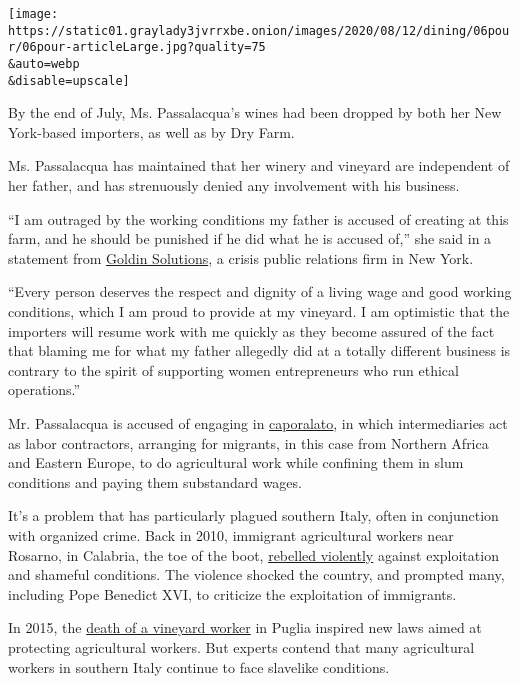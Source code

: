 \texttt{[image: https://static01.graylady3jvrrxbe.onion/images/2020/08/12/dining/06pour/06pour-articleLarge.jpg?quality=75\\\&auto=webp\\\&disable=upscale]}

By the end of July, Ms. Passalacqua's wines had been dropped by both her
New York-based importers, as well as by Dry Farm.

Ms. Passalacqua has maintained that her winery and vineyard are
independent of her father, and has strenuously denied any involvement
with his business.

``I am outraged by the working conditions my father is accused of
creating at this farm, and he should be punished if he did what he is
accused of,'' she said in a statement from
\href{https://www.goldin.com/}{Goldin Solutions}, a crisis public
relations firm in New York.

``Every person deserves the respect and dignity of a living wage and
good working conditions, which I am proud to provide at my vineyard. I
am optimistic that the importers will resume work with me quickly as
they become assured of the fact that blaming me for what my father
allegedly did at a totally different business is contrary to the spirit
of supporting women entrepreneurs who run ethical operations.''

Mr. Passalacqua is accused of engaging in
\href{https://ec.europa.eu/migrant-integration/news/italian-parliamentary-investigation-on-exploitation-of-migrant-workers-in-agriculture}{caporalato},
in which intermediaries act as labor contractors, arranging for
migrants, in this case from Northern Africa and Eastern Europe, to do
agricultural work while confining them in slum conditions and paying
them substandard wages.

It's a problem that has particularly plagued southern Italy, often in
conjunction with organized crime. Back in 2010, immigrant agricultural
workers near Rosarno, in Calabria, the toe of the boot,
\href{https://www.nytimes3xbfgragh.onion/2010/01/11/world/europe/11italy.html}{rebelled
violently} against exploitation and shameful conditions. The violence
shocked the country, and prompted many, including Pope Benedict XVI, to
criticize the exploitation of immigrants.

In 2015, the
\href{https://www.nytimes3xbfgragh.onion/2017/04/11/world/europe/a-womans-death-sorting-grapes-exposes-italys-slavery.html}{death
of a vineyard worker} in Puglia inspired new laws aimed at protecting
agricultural workers. But experts contend that many agricultural workers
in southern Italy continue to face slavelike conditions.

